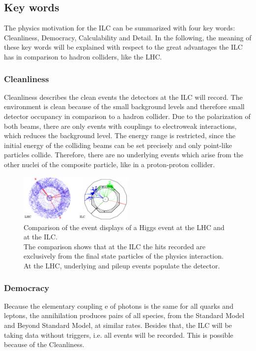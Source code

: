 \subsection{Key words}
The physics motivation for the ILC can be summarized with four key words: Cleanliness, Democracy, Calculability and Detail.\cite[p. 2-5]{TDR2}
In the following, the meaning of these key words will be explained with respect to the great advantages the ILC has in comparison to hadron colliders, like the LHC.
\subsubsection{Cleanliness}
Cleanliness describes the clean events the detectors at the ILC will record.
The environment is clean because of the small background levels and therefore small detector occupancy in comparison to a hadron collider.
Due to the polarization of both beams, there are only events with couplings to electroweak interactions, which reduces the background level.
The energy range is restricted, since the initial energy of the colliding beams can be set precisely and only point-like particles collide.
Therefore, there are no underlying events which arise from the other nuclei of the composite particle, like in a proton-proton collider.

\begin{figure}
\centering
\includegraphics[width=0.5\textwidth]{Figures/Cleanliness.png}
\caption[Clean environment at the ILC]{Comparison of the event displays of a Higgs event at the  LHC and at the ILC.\cite[p. 4]{ILCPhysics_Thomson}\\
The comparison shows that at the ILC the hits recorded are exclusively from the final state particles of the physics interaction.
At the LHC, underlying and pileup events populate the detector.}
\label{fig:Cleanliness}
\end{figure}

\subsubsection{Democracy}
Because the elementary coupling e of photons is the same for all quarks and leptons, the \electron \positron annihilation produces pairs of all species, from the Standard Model and Beyond Standard Model, at similar rates.
Besides that, the ILC will be taking data without triggers, i.e. all events will be recorded.
This is possible because of the Cleanliness.
